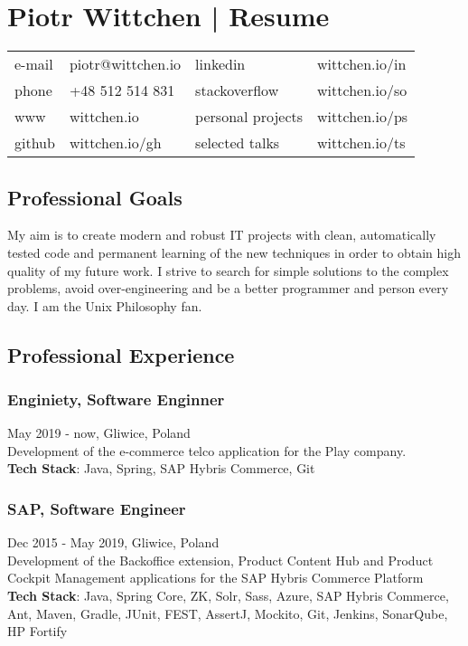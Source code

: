 \documentclass{article}
\begin{document}
  \section*{Piotr Wittchen | Resume}

  \begin{tabular}{llll}\small
    e-mail & piotr@wittchen.io & linkedin          & wittchen.io/in \\
    phone  & +48 512 514 831   & stackoverflow     & wittchen.io/so \\
    www    & wittchen.io       & personal projects & wittchen.io/ps \\
    github & wittchen.io/gh    & selected talks    & wittchen.io/ts \\
  \end{tabular}

    \subsection*{Professional Goals}
    \small{My aim is to create modern and robust IT projects with clean, automatically tested code and permanent learning of the new techniques in order to obtain high quality of my future work. I strive to search for simple solutions to the complex problems, avoid over-engineering and be a better programmer and person every day. I am the Unix Philosophy fan.}
    
    \subsection*{Professional Experience}
    
      \subsubsection*{Enginiety, Software Enginner}
      May 2019 - now, Gliwice, Poland\\[0.3em] 
      Development of the e-commerce telco application for the Play company.\\
      \textbf{Tech Stack}: Java, Spring, SAP Hybris Commerce, Git
      
      \subsubsection*{SAP, Software Engineer} 
      Dec 2015 - May 2019, Gliwice, Poland\\[0.3em]
      Development of the Backoffice extension, Product Content Hub and Product Cockpit Management applications for the SAP Hybris Commerce Platform\\
      \textbf{Tech Stack}: Java, Spring Core, ZK, Solr, Sass, Azure, SAP Hybris Commerce, Ant, Maven, Gradle, JUnit, FEST, AssertJ, Mockito, Git, Jenkins, SonarQube, HP Fortify
\end{document}
